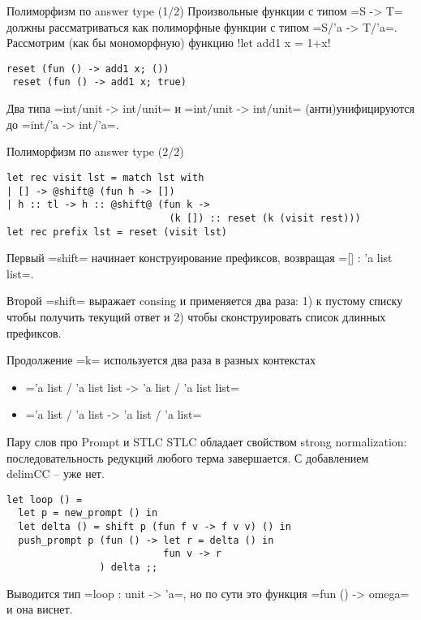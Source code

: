 \documentclass{beamer}
\begin{document}
\begin{frame}[fragile]{Полиморфизм по answer type (1/2)}
Произвольные функции с типом \camline=S -> T= должны рассматриваться как полиморфные функции с типом \camline=S/'a -> T/'a=.\\ \vspace{0.5cm}
Рассмотрим (как бы мономорфную) функцию \camline!let add1 x = 1+x!

\begin{lstlisting}[style={camlstyle1}]
 reset (fun () -> add1 x; ())
 reset (fun () -> add1 x; true)
\end{lstlisting}

Два типа \camline=int/unit -> int/unit= и \camline=int/unit -> int/unit= (анти)унифицируются до \camline=int/'a -> int/'a=.
\end{frame}

\begin{frame}[fragile]{Полиморфизм по answer type (2/2)}
\begin{lstlisting}[style={camlstyle1}]
let rec visit lst = match lst with 
| [] -> @shift@ (fun h -> [])
| h :: tl -> h :: @shift@ (fun k -> 
                            (k []) :: reset (k (visit rest)))
let rec prefix lst = reset (visit lst)
\end{lstlisting}

Первый \camline=shift= начинает конструирование префиксов, возвращая \camline=[] : 'a list list=.

Второй \camline=shift= выражает consing и применяется два раза: 1) к пустому списку чтобы получить текущий ответ и 2) чтобы сконструировать список длинных префиксов.

Продолжение \camline=k= используется два раза в разных контекстах
\begin{itemize}
 \item \camline='a list / 'a list list -> 'a list / 'a list list=
 \item \camline='a list / 'a list -> 'a list / 'a list=
\end{itemize}

\end{frame}

\begin{frame}[fragile]{Пару слов про Prompt и STLC}
STLC обладает свойством strong normalization: последовательность редукций любого терма завершается. С добавлением delimCC -- уже нет.

\begin{lstlisting}[style={camlstyle1}]
let loop () =
  let p = new_prompt () in
  let delta () = shift p (fun f v -> f v v) () in
  push_prompt p (fun () -> let r = delta () in
                           fun v -> r
                ) delta ;;
\end{lstlisting}
Выводится тип \camline=loop : unit -> 'a=, но по сути это функция \camline=fun () -> omega= и она виснет. 


\end{frame}
\end{document}
